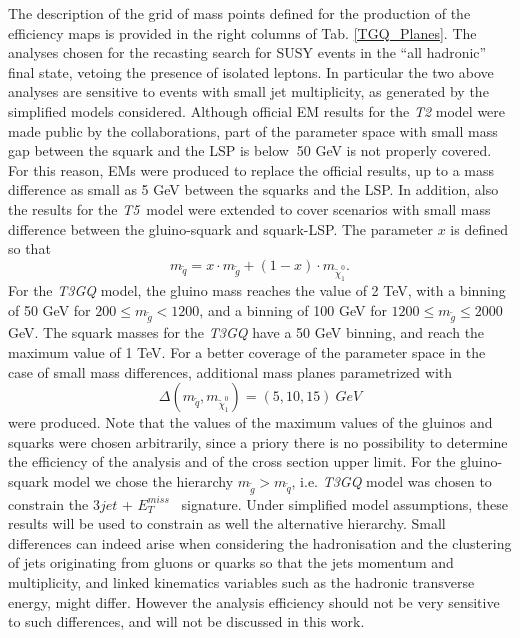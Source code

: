 \documentclass[a4paper,11pt]{article}
\newcommand{\MET}{{ $E_T ^{miss}$}}
\newcommand{\Tfive}{ \textit{T5}}
\begin{document}
The description of the grid of mass points defined for the production of the efficiency maps is provided in the right columns of Tab. \ref{TGQ_Planes}. The analyses chosen for the recasting search for SUSY events in the ``all hadronic'' final state, vetoing the presence of isolated leptons. In particular the two above analyses are sensitive to events with small jet multiplicity, as generated by the simplified models considered. Although official EM results for the \textit{T2} model were made public by the collaborations, part of the parameter space with small mass gap between the squark and the LSP is below $~$50 GeV is not properly covered. For this reason, EMs were produced to replace the official results, up to a mass difference as small as 5 GeV between the squarks and the LSP. In addition, also the results for the \Tfive~model were extended to cover scenarios with small mass difference between the gluino-squark and squark-LSP. The parameter $x$ is defined so that
\begin{equation}
m_{\tilde q}= x\cdot m_{\tilde g} + (1-x)\cdot m_{\tilde \chi_1 ^0}.
\end{equation}
%
For the \textit{T3GQ} model, the gluino mass reaches the value of 2 TeV, with a binning of 50 GeV for $200 \leq m_{\tilde g} < 1200$, and a binning of 100 GeV for $1200 \leq m_{\tilde g}  \leq 2000$ GeV. The squark masses for the \textit{T3GQ} have a 50 GeV binning, and reach the maximum value of 1 TeV. For a better coverage of the parameter space in the case of small mass differences, additional mass planes parametrized with 
\begin{equation}
\Delta  ( m_{\tilde q}, m_{\tilde \chi _1 ^0})=(5,10,15) \ GeV
\end{equation}
were produced. Note that the values of the maximum values of the gluinos and squarks were chosen arbitrarily, since a priory there is no possibility to determine the efficiency of the analysis and of the cross section upper limit.
%
%
For the gluino-squark model we chose the hierarchy $m_{\tilde g} > m_{\tilde q}$, i.e. \textit{T3GQ} model was chosen to constrain the  $3jet$ + \MET~ signature. Under simplified model assumptions, these results will be used to constrain as well the alternative hierarchy. Small differences can indeed arise when considering the hadronisation and the clustering of jets originating from gluons or quarks so that the jets momentum and multiplicity, and linked kinematics variables such as the hadronic transverse energy, might differ. However the analysis efficiency should not be very sensitive to such differences, and will not be discussed in this work. 
\end{document}
